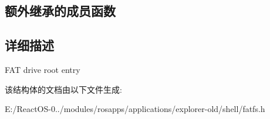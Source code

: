 \subsection*{额外继承的成员函数}


\subsection{详细描述}
F\+AT drive root entry 

该结构体的文档由以下文件生成\+:\begin{DoxyCompactItemize}
\item 
E\+:/\+React\+O\+S-\/0../modules/rosapps/applications/explorer-\/old/shell/fatfs.\+h\end{DoxyCompactItemize}
